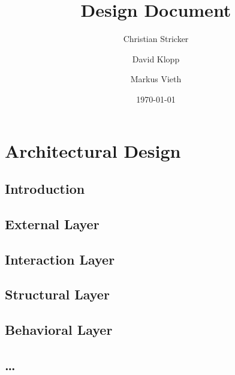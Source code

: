 \documentclass{book}
\title{Design Document}
\author{Christian Stricker \and David Klopp \and Markus Vieth}
\date{\today}
\begin{document}
\frontmatter
\maketitle
\tableofcontents
\mainmatter
\part{Architectural Design}

\chapter{Introduction}
 
 
\chapter{External Layer} %

\chapter{Interaction Layer} %
\chapter{Structural Layer} %
\chapter{Behavioral Layer} %


\chapter{\ldots}
 
\end{document}
